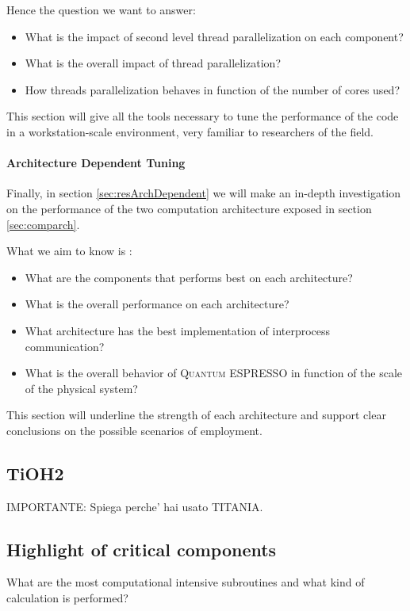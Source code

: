 \documentclass[a4paper,12pt]{article}
\newcommand\QE{\textsc{Quantum} ESPRESSO }
\begin{document}
Hence the question we want to answer:
\begin{itemize}
	\item What is the impact of second level thread parallelization on each component?
	\item What is the overall impact of thread parallelization?
	\item How threads parallelization behaves in function of the number of cores used?
\end{itemize}

This section will give all the tools necessary to tune the performance of the code in a workstation-scale environment, very familiar to researchers of the field.

\paragraph{Architecture Dependent Tuning}
Finally, in section \ref{sec:resArchDependent} we will make an in-depth investigation on the performance of the two computation architecture exposed in section \ref{sec:comparch}.

What we aim to know is :
\begin{itemize}
	\item What are the components that performs best on each architecture?
	\item What is the overall performance on each architecture?
	\item What architecture has the best implementation of interprocess communication?
	\item What is the overall behavior of \QE in function of the scale of the physical system?
\end{itemize}

This section will underline the strength of each architecture and support clear conclusions on the possible scenarios of employment.

\newpage

\subsection{TiOH2}
IMPORTANTE: Spiega perche' hai usato TITANIA.

\newpage
\subsection{Highlight of critical components}\label{sec:resCriticalComponents}

\begin{center}
\begin{framed}
What are the most computational intensive subroutines and what kind of calculation is performed?
\end{framed}
\end{center}
\end{document}
